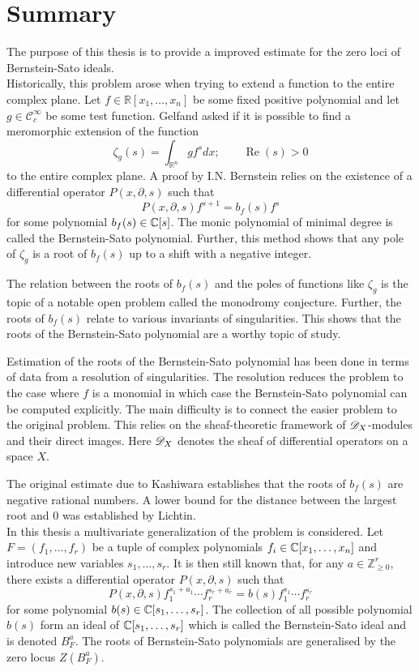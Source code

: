 \chapter*{Summary}\label{ch: Summary} %


The purpose of this thesis is to provide a improved estimate for the zero loci of Bernstein-Sato ideals.\\

\noindent
Historically, this problem arose when trying to extend a function to the entire complex plane.
Let $f\in \mathbb{R}[x_1,\ldots,x_n]$ be some fixed positive polynomial and let $g \in \mathcal{C}_c^\infty$ be some test function.
Gelfand asked if it is possible to find a meromorphic extension of the function
$$\zeta_g(s) = \int_{\mathbb{R}^n} g f^s dx; \qquad \operatorname{Re}(s)>0 $$
to the entire complex plane.
A proof by I.N. Bernstein relies on the existence of a differential operator $P(x,\partial, s)$ such that
$$P(x,\partial,s) f^{s+1} = b_f(s) f^s$$
for some polynomial $b_f(s)\in \mathbb{C}[s]$.
The monic polynomial of minimal degree is called the Bernstein-Sato polynomial.
Further, this method shows that any pole of $\zeta_g$ is a root of $b_f(s)$ up to a shift with a negative integer.

The relation between the roots of $b_f(s)$ and the poles of functions like $\zeta_g$ is the topic of a notable open problem called the monodromy conjecture.
Further, the roots of $b_f(s)$ relate to various invariants of singularities.
This shows that the roots of the Bernstein-Sato polynomial are a worthy topic of study.

Estimation of the roots of the Bernstein-Sato polynomial has been done in terms of data from a resolution of singularities.
The resolution reduces the problem to the case where $f$ is a monomial in which case the Bernstein-Sato polynomial can be computed explicitly.
The main difficulty is to connect the easier problem to the original problem.
This relies on the sheaf-theoretic framework of $\mathscr{D}_X$-modules and their direct images.
Here $\mathscr{D}_X$ denotes the sheaf of differential operators on a space $X$.

The original estimate due to Kashiwara establishes that the roots of $b_f(s)$ are negative rational numbers.
A lower bound for the distance between the largest root and $0$ was established by Lichtin.
\\

\noindent
In this thesis a multivariate generalization of the problem is considered.
Let $F= (f_1,\ldots,f_r)$ be a tuple of complex polynomials $f_i \in \mathbb{C}[x_1,\ldots,x_n]$ and introduce new variables $s_1,\ldots, s_r$.
It is then still known that, for any $a \in \mathbb{Z}_{\geq 0}^r$, there exists a differential operator $P(x,\partial, s)$ such that
$$P(x,\partial,s) f_1^{s_1 + a_1}\cdots f_r^{s_r + a_r} = b(s)f_1^{s_1}\cdots f_r^{s_r}$$
for some polynomial $b(s) \in \mathbb{C}[s_1,\ldots, s_r]$.
The collection of all possible polynomial $b(s)$ form an ideal of $\mathbb{C}[s_1,\ldots,s_r]$ which is called the Bernstein-Sato ideal and is denoted $B_{F}^a$.
The roots of Bernstein-Sato polynomials are generalised by the zero locus $Z(B_F^a)$.

